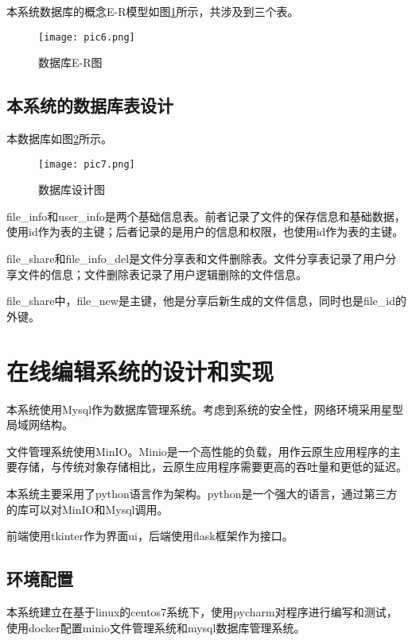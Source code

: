 \documentclass[forprint]{software}
\begin{document}
本系统数据库的概念E-R模型如图\ref{fig:6}所示，共涉及到三个表。

\begin{figure}[!htbp]
	\centering
	\texttt{[image: pic6.png]}
	\caption{数据库E-R图}
	\label{fig:6}
\end{figure}

\section{本系统的数据库表设计}

本数据库如图\ref{fig:7}所示。

\begin{figure}[!htbp]
	\centering
	\texttt{[image: pic7.png]}
	\caption{数据库设计图}
	\label{fig:7}
\end{figure}

file\_info和user\_info是两个基础信息表。前者记录了文件的保存信息和基础数据，使用id作为表的主键；后者记录的是用户的信息和权限，也使用id作为表的主键。

file\_share和file\_info\_del是文件分享表和文件删除表。文件分享表记录了用户分享文件的信息；文件删除表记录了用户逻辑删除的文件信息。

file\_share中，file\_new是主键，他是分享后新生成的文件信息，同时也是file\_id的外键。



\chapter{在线编辑系统的设计和实现}

本系统使用Mysql作为数据库管理系统。考虑到系统的安全性，网络环境采用星型局域网结构。

文件管理系统使用MinIO。Minio是一个高性能的负载，用作云原生应用程序的主要存储，与传统对象存储相比，云原生应用程序需要更高的吞吐量和更低的延迟。

本系统主要采用了python语言作为架构。python是一个强大的语言，通过第三方的库可以对MinIO和Mysql调用。

前端使用tkinter作为界面ui，后端使用flask框架作为接口。

\section{环境配置}

本系统建立在基于linux的centos7系统下，使用pycharm对程序进行编写和测试，使用docker配置minio文件管理系统和mysql数据库管理系统。
\end{document}
